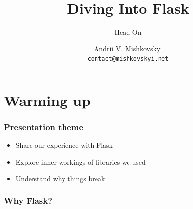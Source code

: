 \documentclass[14pt]{beamer}
\title{Diving Into Flask}
\subtitle{Head On}
\author[A. Mishkovskyi]{Andrii V. Mishkovskyi \\ \texttt{contact@mishkovskyi.net}}
\date[EuroPython 2012]
\begin{document}
\frame{\titlepage}

\section{Warming up}




\begin{frame}
  \frametitle{Presentation theme}
  \begin{itemize}
  \item Share our experience with Flask
  \item Explore inner workings of libraries we used
  \item Understand why things break
  \end{itemize}
\end{frame}

\begin{frame}
  \frametitle{Why Flask?}
\end{frame}
\end{document}
